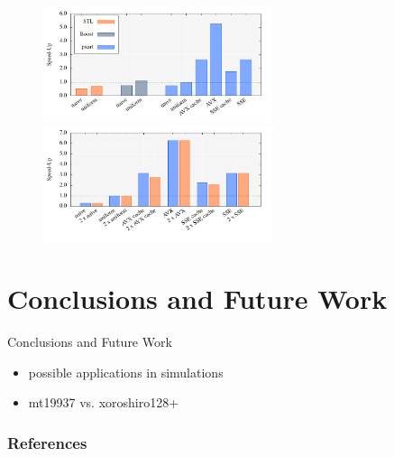\documentclass[aspectratio=169]{beamer}
\begin{document}
    \begin{frame}
      \begin{figure}
        \includegraphics[width=0.6\textwidth]{figures/monte_carlo_pi_desktop_mt19937.pdf}\\
        \includegraphics[width=0.6\textwidth]{figures/monte_carlo_pi_desktop_xrsr128p.pdf}
      \end{figure}
    \end{frame}

  \section{Conclusions and Future Work} %
  \label{sec:conclusions}
    \begin{frame}{Conclusions and Future Work}
      \begin{itemize}
        \item possible applications in simulations
        \item mt19937 vs. xoroshiro128+
      \end{itemize}
    \end{frame}

  \begin{frame}
    \frametitle{References}
  \end{frame}
\end{document}
